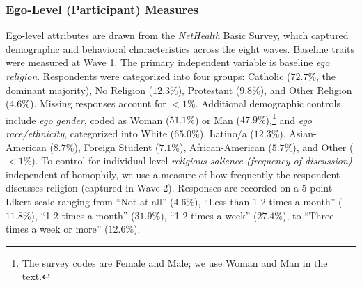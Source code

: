 \documentclass[11pt]{article}
\begin{document}
\subsubsection{Ego-Level (Participant) Measures}
Ego-level attributes are drawn from the \textit{NetHealth} Basic Survey, which captured demographic and behavioral characteristics across the eight waves. Baseline traits were measured at Wave 1. The primary independent variable is baseline \textit{ego religion}. Respondents were categorized into four groups: Catholic ($72.7\%$, the dominant majority), No Religion ($12.3\%$), Protestant ($9.8\%$), and Other Religion ($4.6\%$). Missing responses account for $<1\%$. Additional demographic controls include \textit{ego gender}, coded as Woman ($51.1\%$) or Man ($47.9\%$),\footnote{The survey codes are Female and Male; we use Woman and Man in the text.} and \textit{ego race/ethnicity}, categorized into White ($65.0\%$), Latino/a ($12.3\%$), Asian-American ($8.7\%$), Foreign Student ($7.1\%$), African-American ($5.7\%$), and Other ($<1\%$). To control for individual-level \textit{religious salience (frequency of discussion)} independent of homophily, we use a measure of how frequently the respondent discusses religion (captured in Wave 2). Responses are recorded on a 5-point Likert scale ranging from ``Not at all'' ($4.6\%$), ``Less than 1-2 times a month'' ($11.8\%$), ``1-2 times a month'' ($31.9\%$), ``1-2 times a week'' ($27.4\%$), to ``Three times a week or more'' ($12.6\%$).
\end{document}
